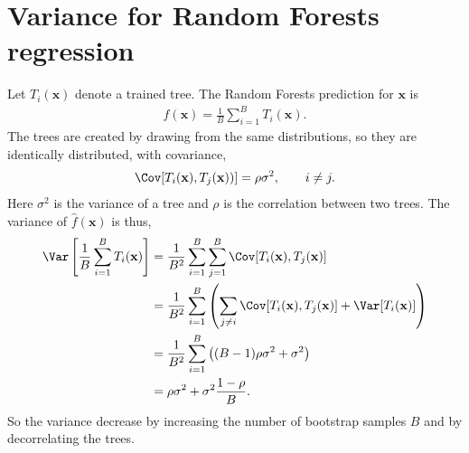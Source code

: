 \section{Variance for Random Forests regression}
\label{sec:Variance for Random Forests regression}
Let $T_i(\mathbf{x})$ denote a trained tree. The Random Forests prediction for $\mathbf{x}$ is 
\begin{align}
  \hat f(\mathbf{x}) = \frac{1}{B} \sum_{i = 1}^{B} T_i(\mathbf{x}).
\end{align}
The trees are created by drawing from the same distributions, so they are identically distributed, with covariance,
\begin{align}
  \Cov[T_i(\mathbf{x}), T_j(\mathbf{x}))] = \rho \sigma^2, \quad \quad i \neq j.
\end{align}
Here $\sigma^2$ is the variance of a tree and $\rho$ is the correlation between two trees.  
The variance of $\hat f(\mathbf{x})$ is thus,
\begin{align}
\Var\left[ \frac{1}{B} \sum_{i = 1}^{B} T_i(\mathbf{x}) \right] 
&= \frac{1}{B^2} \sum_{i =1}^B \sum_{j= 1}^B \Cov[T_i(\mathbf{x}), T_j(\mathbf{x})] \notag \\
&= \frac{1}{B^2} \sum_{i =1}^B \left(\sum_{j \neq i} \Cov[T_i(\mathbf{x}), T_j(\mathbf{x})] + \Var[T_i(\mathbf{x})]  \right)\notag \\
&= \frac{1}{B^2} \sum_{i =1}^B \left( (B-1) \rho \sigma^2 + \sigma^2  \right)\notag \\
&= \rho \sigma^2 + \sigma^2 \frac{1-\rho}{B}.
\end{align}
So the variance decrease by increasing the number of bootstrap samples $B$ and by decorrelating the trees.
